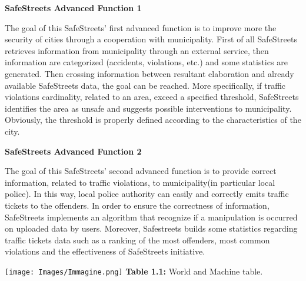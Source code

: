 \documentclass[12pt]{article}
\begin{document}
\begin{flushleft}
\textbf{SafeStreets Advanced Function 1}
\end{flushleft}
\vspace{3mm}
The goal of this SafeStreets’ first advanced function is to improve more the security of cities through a cooperation with municipality. First of all SafeStreets retrieves information from municipality through an external service, then information are categorized (accidents, violations, etc.) and some statistics are generated. Then crossing information between resultant elaboration and already available SafeStreets data, the goal can be reached. More specifically, if traffic violations cardinality, related to an area, exceed a specified threshold, SafeStreets identifies the area as unsafe and suggests possible interventions to municipality. Obviously, the threshold is properly defined according to the characteristics of the city.

\newpage

\begin{flushleft}
\textbf{SafeStreets Advanced Function 2}
\end{flushleft}
\vspace{3mm}
The goal of this SafeStreets’ second advanced function is to provide correct information, related to traffic violations, to municipality(in particular local police). In this way, local police authority can easily and correctly emits traffic tickets to the offenders. In order to ensure the correctness of information, SafeStreets implements an algorithm that recognize if a manipulation is occurred on uploaded data by users. Moreover, Safestreets builds some statistics regarding traffic tickets data such as a ranking of the most offenders, most common violations and the effectiveness of SafeStreets initiative.
\vspace{4mm}
\begin{center}
	
	 	\vspace{4mm}
	 	
 	 	\texttt{[image: Images/Immagine.png]}
 	 	\textbf{Table 1.1:} World and Machine table.
	\end{center}


\newpage
\end{document}
